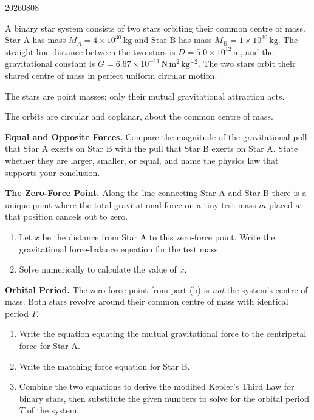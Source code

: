 

\begin{problem}{20260808}

A binary star system consists of two stars orbiting their common centre of mass.  Star A has mass $M_A = 4\times10^{30}\,\mathrm{kg}$ and Star B has mass $M_B = 1\times10^{30}\,\mathrm{kg}$.  The straight-line distance between the two stars is $D = 5.0\times10^{12}\,\mathrm{m}$, and the gravitational constant is $G = 6.67\times10^{-11}\,\mathrm{N\,m^{2}\,kg^{-2}}$.  The two stars orbit their shared centre of mass in perfect uniform circular motion.

\begin{assumptions}
  \item The stars are point masses; only their mutual gravitational attraction acts.
  \item The orbits are circular and coplanar, about the common centre of mass.
\end{assumptions}

\begin{questions}
  \item \textbf{Equal and Opposite Forces.}
        Compare the magnitude of the gravitational pull that Star A exerts on Star B with the pull that Star B exerts on Star A.  State whether they are larger, smaller, or equal, and name the physics law that supports your conclusion.

  \item \textbf{The Zero-Force Point.}
        Along the line connecting Star A and Star B there is a unique point where the total gravitational force on a tiny test mass $m$ placed at that position cancels out to zero.
        \begin{enumerate}[label=\arabic*.]
          \item Let $x$ be the distance from Star A to this zero-force point.  Write the gravitational force-balance equation for the test mass.
          \item Solve numerically to calculate the value of $x$.
        \end{enumerate}

  \item \textbf{Orbital Period.}
        The zero-force point from part (b) is \emph{not} the system's centre of mass.  Both stars revolve around their common centre of mass with identical period $T$.
        \begin{enumerate}[label=\arabic*.]
          \item Write the equation equating the mutual gravitational force to the centripetal force for Star A.
          \item Write the matching force equation for Star B.
          \item Combine the two equations to derive the modified Kepler's Third Law for binary stars, then substitute the given numbers to solve for the orbital period $T$ of the system.
        \end{enumerate}


\end{questions}
\end{problem}
